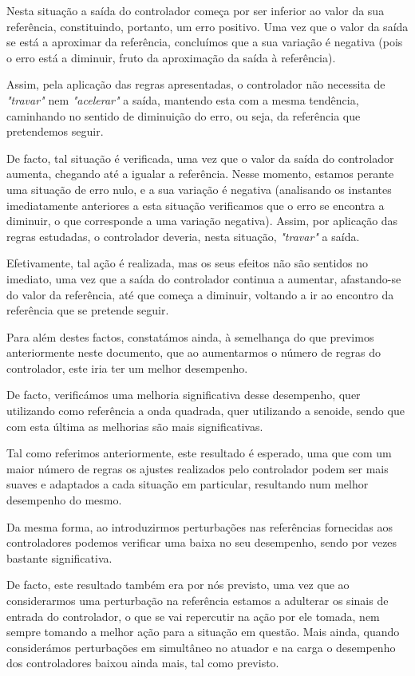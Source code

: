 \documentclass{article}
\begin{document}
Nesta situação a saída do controlador começa por ser inferior ao valor da sua referência, constituindo, portanto, um erro positivo. Uma vez que o valor da saída se está a aproximar da referência, concluímos que a sua variação é negativa (pois o erro está a diminuir, fruto da aproximação da saída à referência).

Assim, pela aplicação das regras apresentadas, o controlador não necessita de \emph{"travar"} nem \emph{"acelerar"} a saída, mantendo esta com a mesma tendência, caminhando no sentido de diminuição do erro, ou seja, da referência que pretendemos seguir.

De facto, tal situação é verificada, uma vez que o valor da saída do controlador aumenta, chegando até a igualar a referência. Nesse momento, estamos perante uma situação de erro nulo, e a sua variação é negativa (analisando os instantes imediatamente anteriores a esta situação verificamos que o erro se encontra a diminuir, o que corresponde a uma variação negativa). Assim, por aplicação das regras estudadas, o controlador deveria, nesta situação, \emph{"travar"} a saída.

Efetivamente, tal ação é realizada, mas os seus efeitos não são sentidos no imediato, uma vez que a saída do controlador continua a aumentar, afastando-se do valor da referência, até que começa a diminuir, voltando a ir ao encontro da referência que se pretende seguir.

Para além destes factos, constatámos ainda, à semelhança do que previmos anteriormente neste documento, que ao aumentarmos o número de regras do controlador, este iria ter um melhor desempenho.

De facto, verificámos uma melhoria significativa desse desempenho, quer utilizando como referência a onda quadrada, quer utilizando a senoide, sendo que com esta última as melhorias são mais significativas.

Tal como referimos anteriormente, este resultado é esperado, uma que com um maior número de regras os ajustes realizados pelo controlador podem ser mais suaves e adaptados a cada situação em particular, resultando num melhor desempenho do mesmo.

Da mesma forma, ao introduzirmos perturbações nas referências fornecidas aos controladores podemos verificar uma baixa no seu desempenho, sendo por vezes bastante significativa.

De facto, este resultado também era por nós previsto, uma vez que ao considerarmos uma perturbação na referência estamos a adulterar os sinais de entrada do controlador, o que se vai repercutir na ação por ele tomada, nem sempre tomando a melhor ação para a situação em questão. Mais ainda, quando considerámos perturbações em simultâneo no atuador e na carga o desempenho dos controladores baixou ainda mais, tal como previsto.
\end{document}
